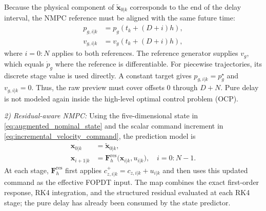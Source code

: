 \documentclass[letterpaper, 10 pt, conference]{ieeeconf}  %
\begin{document}
Because the physical component of $\tilde{\mathbf x}_{0|k}$ corresponds to the end of the delay interval, the
NMPC reference must be aligned with the same future time:
\begin{equation}
\begin{aligned}
    p_{g,i|k}&=p_g\!\left(t_k+(D+i)h\right),\\
    v_{g,i|k}&=v_g\!\left(t_k+(D+i)h\right),
\end{aligned}
    \label{eq:delay_aligned_reference}
\end{equation}
where $i=0{:}N$ applies to both references. The reference generator supplies $v_g$, which equals $\dot p_g$
where the reference is differentiable. For
piecewise trajectories, its discrete stage value is used directly. A constant target gives
$p_{g,i|k}=p_g^\star$ and $v_{g,i|k}=0$. Thus, the raw preview must cover offsets $0$ through $D+N$. Pure delay
is not modeled again inside the high-level optimal control problem (OCP).

\textit{2) Residual-aware NMPC:}
Using the five-dimensional state in \eqref{eq:augmented_nominal_state} and the scalar command increment in
\eqref{eq:incremental_velocity_command}, the prediction model is
\begin{equation}
\begin{aligned}
    \mathbf x_{0|k}&=\tilde{\mathbf x}_{0|k},\\
    \mathbf x_{i+1|k}
    &=\mathbf F_h^{\mathrm{res}}
    \bigl(\mathbf x_{i|k},u_{i|k}\bigr),
    \quad i=0{:}N-1.
\end{aligned}
    \label{eq:residual_aware_prediction_model}
\end{equation}
At each stage, $\mathbf F_h^{\mathrm{res}}$ first applies
$c_{z,i|k}^{+}=c_{z,i|k}+u_{i|k}$ and then uses this updated command as the effective FOPDT input. The map combines
the exact first-order response, RK4 integration, and the structured residual evaluated at each RK4 stage; the
pure delay has already been consumed by the state predictor.
\end{document}
